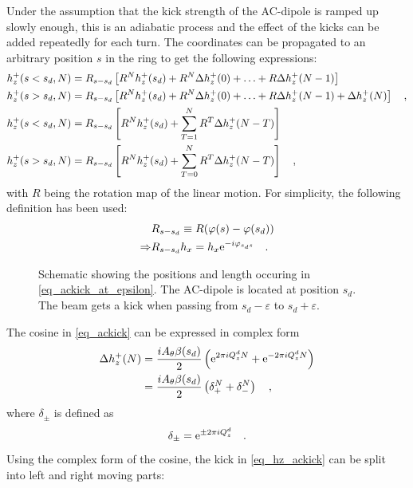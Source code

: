 Under the assumption that the kick strength of the AC-dipole is ramped up slowly enough, this is an
adiabatic process and the effect of the kicks can be added repeatedly for each turn.
The coordinates can be propagated to an arbitrary position $s$ in the ring to get the following
expressions:
%
\begin{align}
    h_z^+(s<s_d, N) &= R_{s-s_d}\left[R^N h_z^+(s_d) + R^N\Delta h_z^+(0) + \ldots + R\Delta h_z^+(N-1)\right] \notag\\
    h_z^+(s>s_d, N) &= R_{s-s_d}\left[R^N h_z^+(s_d) + R^N\Delta h_z^+(0) + \ldots + R\Delta h_z^+(N-1) + \Delta h_z^+(N)\right] 
    \quad ,\\
    h_z^+(s<s_d, N) &= R_{s-s_d}\left[R^N h_z^+(s_d) + \sum\limits_{T=1}^N R^T\Delta h_z^+(N-T)\right] \notag\\
    h_z^+(s>s_d, N) &= R_{s-s_d}\left[R^N h_z^+(s_d) + \sum\limits_{T=0}^N R^T\Delta h_z^+(N-T)\right]
    \quad ,
    \label{eq_hz_ackick}
\end{align}
%
with $R$ being the rotation map of the linear motion. For simplicity, the following definition has been used:
%
\begin{align}
    &R_{s-s_d} \equiv R(\varphi(s) - \varphi(s_d))\\
    \Rightarrow &R_{s-s_d} h_x = h_x \text{e}^{-i\varphi_{s_d s}}
    \quad .
\end{align}
%
\begin{figure}
    \centering
     
    \caption{
        Schematic showing the positions and length occuring in \eqref{eq_ackick_at_epsilon}.
        The AC-dipole is located at position $s_d$.
        The beam gets a kick when passing from $s_d - \varepsilon$ to $s_d + \varepsilon$.
    }
\end{figure}
%
The cosine in \eqref{eq_ackick} can be expressed in complex form
%
\begin{align}
    \Delta h_z^+(N) &= \frac{iA_\theta\beta(s_d)}{2} \left(
        \text{e}^{2\pi i Q^{d}_{z} N} +
        \text{e}^{-2\pi i Q^{d}_{z} N}
    \right) \notag\\
    &= \frac{iA_\theta\beta(s_d)}{2} \left(
        \delta_+^N + \delta_-^N
    \right)
    \quad ,
\end{align}
%
where $\delta_\pm$ is defined as
%
\begin{equation}
    \delta_\pm = \text{e}^{\pm 2\pi i Q^{d}_{z}}
    \quad .
\end{equation}
%
Using the complex form of the cosine, the kick in \eqref{eq_hz_ackick} can be split into left and right moving parts:
